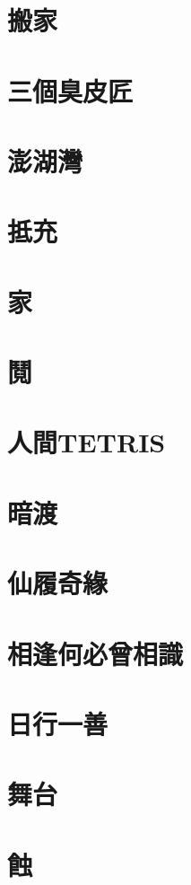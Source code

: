 \chapter{搬家}
\chapter{三個臭皮匠}
\chapter{澎湖灣}
\chapter{抵充}
\chapter{家}
\chapter{鬩}
\chapter{人間TETRIS}
\chapter{暗渡}
\chapter{仙履奇緣}
\chapter{相逢何必曾相識}
\chapter{日行一善}
\chapter{舞台}
\chapter{蝕}
